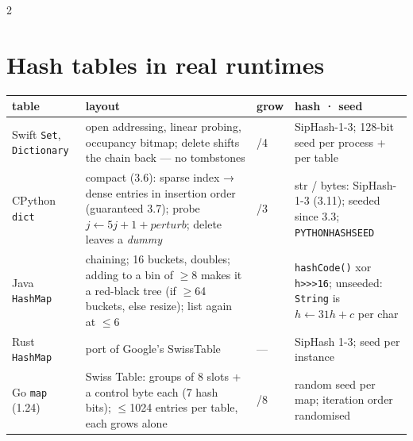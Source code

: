 \documentclass[8pt]{extarticle}
\newcommand\ct[1]{\texttt{#1}}
\begin{document}
\begin{multicols}{2}
\raggedright
\footnotesize{}

\section{Hash tables in real runtimes}
{\scriptsize\setlength{\tabcolsep}{2pt}
\begin{tabular}{@{}>{\raggedright\arraybackslash}p{11mm}>{\raggedright\arraybackslash}p{36mm}>{\raggedright\arraybackslash}p{6mm}>{\raggedright\arraybackslash}p{22mm}@{}}
\toprule
\textbf{table} & \textbf{layout} & \textbf{grow} & \textbf{hash · seed}\\
\midrule
Swift \ct{Set}, \ct{Dictionary} & open addressing, linear probing, occupancy bitmap; delete shifts the chain back — no tombstones & 3/4 & SipHash-1-3; 128-bit seed per process + per table\\
CPython \ct{dict} & compact (3.6): sparse index → dense entries in insertion order (guaranteed 3.7); probe $j \leftarrow 5j{+}1{+}perturb$; delete leaves a \emph{dummy} & 2/3 & str / bytes: SipHash-1-3 (3.11); seeded since 3.3; \ct{PYTHONHASHSEED}\\
Java \ct{HashMap} & chaining; 16 buckets, doubles; adding to a bin of $\ge$8 makes it a red-black tree (if $\ge$64 buckets, else resize); list again at $\le$6 & 0.75 & \ct{hashCode()} xor \ct{h>>>16}; unseeded: \ct{String} is $h \leftarrow 31h + c$ per char\\
Rust \ct{HashMap} & port of Google's SwissTable & — & SipHash 1-3; seed per instance\\
Go \ct{map} (1.24) & Swiss Table: groups of 8 slots + a control byte each (7 hash bits); $\le$1024 entries per table, each grows alone & 7/8 & random seed per map; iteration order randomised\\
\bottomrule
\end{tabular}}


\end{multicols}
\end{document}
